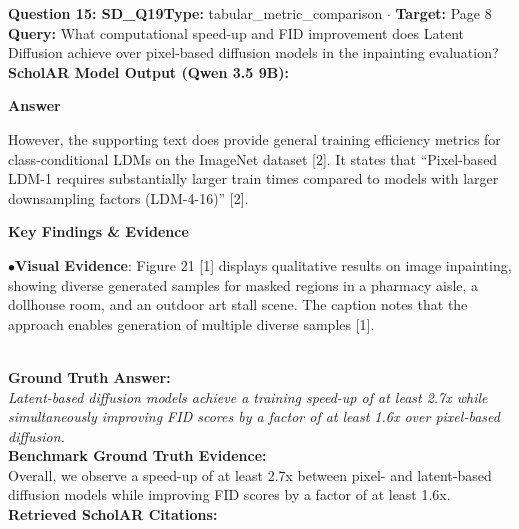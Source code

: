 \documentclass[10pt,a4paper]{article}
\begin{document}
\begin{tcolorbox}[questionbox]
{\noindent\bfseries\large\color{navy} Question 15: SD\_Q19}\hfill {\footnotesize\color{darkteal}\textbf{Type:} tabular\_metric\_comparison $\cdot$ \textbf{Target:} Page 8}\\[4pt]
{\noindent\bfseries\color{accentblue} Query: } What computational speed-up and FID improvement does Latent Diffusion achieve over pixel-based diffusion models in the inpainting evaluation?\\[6pt]
{\noindent\bfseries\color{navy} ScholAR Model Output (Qwen 3.5 9B):}\\[2pt]
{\small \noindent \textbf{Answer}\par\vspace{3pt}However, the supporting text does provide general training efficiency metrics for class-conditional LDMs on the ImageNet dataset [2]. It states that ``Pixel-based LDM-1 requires substantially larger train times compared to models with larger downsampling factors (LDM-{4-16})'' [2].\par\vspace{3pt}\noindent \textbf{Key Findings \& Evidence}\par\vspace{3pt}\noindent\hspace*{8pt}$\bullet$\hspace*{4pt}\textbf{Visual Evidence}: Figure 21 [1] displays qualitative results on image inpainting, showing diverse generated samples for masked regions in a pharmacy aisle, a dollhouse room, and an outdoor art stall scene. The caption notes that the approach enables generation of multiple diverse samples [1].}\\[6pt]
{\noindent\bfseries\color{darkteal} Ground Truth Answer:}\\[2pt]
{\small\itshape Latent-based diffusion models achieve a training speed-up of at least 2.7x while simultaneously improving FID scores by a factor of at least 1.6x over pixel-based diffusion.}\\[4pt]
{\noindent\bfseries\color{darkteal} Benchmark Ground Truth Evidence:}\\[2pt]
{\footnotesize Overall, we observe a speed-up of at least 2.7x between pixel- and latent-based diffusion models while improving FID scores by a factor of at least 1.6x.}\\[4pt]
{\noindent\bfseries\color{navy} Retrieved ScholAR Citations:}\\[2pt]
\begin{itemize}\setlength\itemsep{1pt}

\end{itemize}
\end{tcolorbox}
\end{document}
